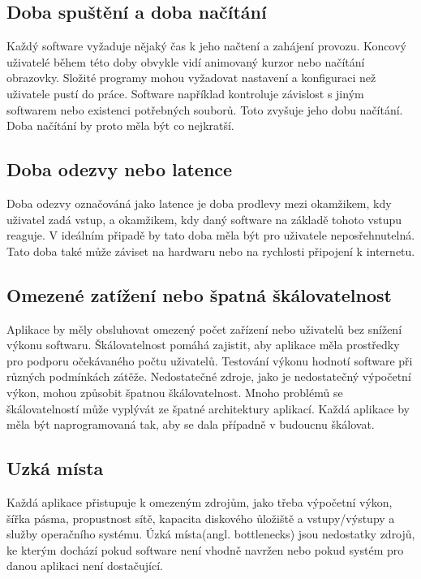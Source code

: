\subsection*{Doba spuštění a doba načítání}

Každý software vyžaduje nějaký čas k jeho načtení a zahájení provozu. Koncový uživatelé během této doby obvykle vidí animovaný kurzor nebo
načítání obrazovky. Složité programy mohou vyžadovat nastavení a konfiguraci než uživatele pustí do práce. Software například kontroluje
závislost s jiným softwarem nebo existenci potřebných souborů. Toto zvyšuje jeho dobu načítání. Doba načítání by proto měla být co nejkratší.

\subsection*{Doba odezvy nebo latence}

Doba odezvy označováná jako latence je doba prodlevy mezi okamžikem, kdy uživatel zadá vstup, a okamžikem, kdy daný software na základě tohoto vstupu reaguje.
V ideálním připadě by tato doba měla být pro uživatele neposřehnutelná. Tato doba také může záviset na hardwaru nebo na rychlosti připojení k internetu.

\subsection*{Omezené zatížení nebo špatná škálovatelnost}

Aplikace by měly obsluhovat omezený počet zařízení nebo uživatelů bez snížení výkonu softwaru. Škálovatelnost pomáhá zajistit, aby aplikace měla prostředky pro podporu očekávaného počtu uživatelů.
Testování výkonu hodnotí software při různých podmínkách zátěže. Nedostatečné zdroje, jako je nedostatečný výpočetní výkon, mohou způsobit špatnou škálovatelnost.
Mnoho problémů se škálovatelností může vyplývát ze špatné architektury aplikací. Každá aplikace by měla být naprogramovaná tak, aby se dala případně v budoucnu škálovat.

\subsection*{Uzká místa}

Každá aplikace přistupuje k omezeným zdrojům, jako třeba výpočetní výkon, šířka pásma, propustnost sítě, kapacita diskového ůložiště a vstupy/výstupy
a služby operačního systému. Úzká místa(angl. bottlenecks) jsou nedostatky zdrojů, ke kterým dochází pokud software není vhodně navržen nebo pokud systém pro danou aplikaci není dostačující.

